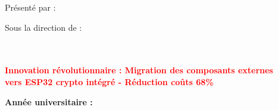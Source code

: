 \begin{titlepage}
    \vspace{1.5cm}
    
    {\Large Présenté par : \textbf{\auteur}}\\
    
    \vspace{1.5cm}
    
    {\large Sous la direction de :}\\
    {\large \textbf{\directeur}}\\
    {\large \textbf{\codirecteur}}\\
    
    \vspace{1cm}
    
    {\large \textcolor{red}{\textbf{Innovation révolutionnaire : Migration des composants externes}}}\\
    {\large \textcolor{red}{\textbf{vers ESP32 crypto intégré - Réduction coûts 68\%}}}\\
    
    \vfill
    
    {\large \textbf{Année universitaire : \annee}}\\
    
\end{titlepage}

\cleardoublepage